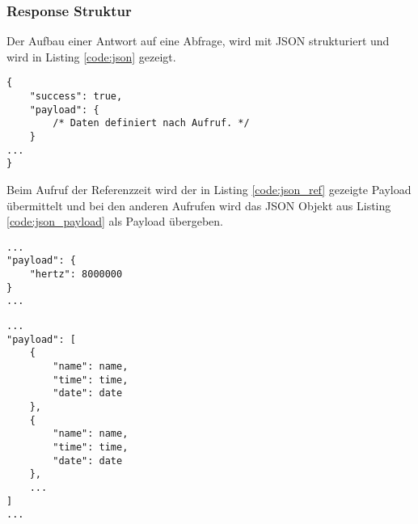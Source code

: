 \clearpage
\subsubsection{Response Struktur}\label{sec:rest_struct}
Der Aufbau einer Antwort auf eine Abfrage, wird mit JSON strukturiert und wird in Listing \ref{code:json} gezeigt.
\begin{lstlisting}[caption="generische Antwortstruktur mit JSON",label={code:json}]
{
    "success": true,
    "payload": {
        /* Daten definiert nach Aufruf. */
    }
...
}
\end{lstlisting}

\noindent Beim Aufruf der Referenzzeit wird der in Listing \ref{code:json_ref} gezeigte Payload übermittelt und bei den anderen Aufrufen wird das JSON Objekt aus Listing \ref{code:json_payload} als Payload übergeben.
\begin{lstlisting}[caption="Payload für Referenzzeit",label={code:json_ref}]
...
"payload": {
    "hertz": 8000000
}
...
\end{lstlisting}
\begin{lstlisting}[caption="Payload für Datums und Namensabfrage",label={code:json_payload}]
...
"payload": [
    {
        "name": name,
        "time": time,
        "date": date
    },
    {
        "name": name,
        "time": time,
        "date": date
    },
    ...
]
...
\end{lstlisting}
